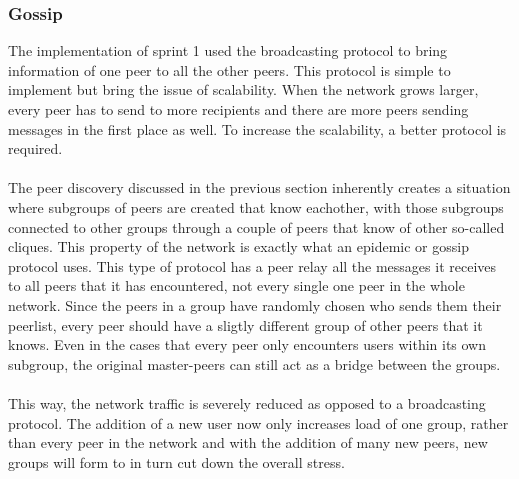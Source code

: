 \subsubsection{Gossip}
The implementation of sprint 1 used the broadcasting protocol to bring information of one peer to all the other peers.
This protocol is simple to implement but bring the issue of scalability. 
When the network grows larger, every peer has to send to more recipients and there are more peers sending messages in the first place as well.
To increase the scalability, a better protocol is required.\\
\\
The peer discovery discussed in the previous section inherently creates a situation where subgroups of peers are created that know eachother, with those subgroups connected to other groups through a couple of peers that know of other so-called cliques.
This property of the network is exactly what an epidemic or gossip protocol uses.
This type of protocol has a peer relay all the messages it receives to all peers that it has encountered, not every single one peer in the whole network.
Since the peers in a group have randomly chosen who sends them their peerlist, every peer should have a sligtly different group of other peers that it knows.
Even in the cases that every peer only encounters users within its own subgroup, the original master-peers can still act as a bridge between the groups.\\
\\
This way, the network traffic is severely reduced as opposed to a broadcasting protocol.
The addition of a new user now only increases load of one group, rather than every peer in the network and with the addition of many new peers, new groups will form to in turn cut down the overall stress.
